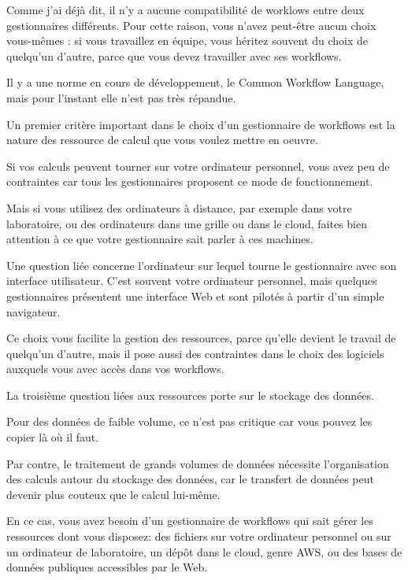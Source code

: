 \documentclass[12pt]{article}
\begin{document}
Comme j'ai déjà dit, il n'y a aucune compatibilité de worklows entre
deux gestionnaires différents. Pour cette raison, vous n'avez
peut-être aucun choix vous-mêmes : si vous travaillez en équipe, vous
héritez souvent du choix de quelqu'un d'autre, parce que vous devez
travailler avec ses workflows.

Il y a une norme en cours de développement, le Common Workflow
Language, mais pour l'instant elle n'est pas très répandue.

\newpage

Un premier critère important dans le choix d'un gestionnaire
de workflows est la nature des ressource de calcul que vous
voulez mettre en oeuvre.

Si vos calculs peuvent tourner sur votre ordinateur personnel,
vous avez peu de contraintes car tous les gestionnaires proposent
ce mode de fonctionnement.

Mais si vous utilisez des ordinateurs à distance, par exemple dans
votre laboratoire, ou des ordinateurs dans une grille
ou dans le cloud, faites bien attention à ce que votre gestionnaire
sait parler à ces machines.

\newpage

Une question liée concerne l'ordinateur sur lequel tourne le
gestionnaire avec son interface utilisateur. C'est souvent votre
ordinateur personnel, mais quelques gestionnaires présentent une
interface Web et sont pilotés à partir d'un simple navigateur.

Ce choix vous facilite la gestion des ressources, parce qu'elle
devient le travail de quelqu'un d'autre, mais il pose aussi des
contraintes dans le choix des logiciels auxquels vous avec accès dans
vos workflows.

\newpage

La troisième question liées aux ressources porte sur le stockage des
données.

Pour des données de faible volume, ce n'est pas critique car vous
pouvez les copier là où il faut.

Par contre, le traitement de grands volumes de données nécessite
l'organisation des calculs autour du stockage des données, car le
transfert de données peut devenir plus couteux que le calcul lui-même.

En ce cas, vous avez besoin d'un gestionnaire de workflows qui sait
gérer les ressources dont vous disposez: des fichiers sur votre
ordinateur personnel ou sur un ordinateur de laboratoire, un dépôt
dans le cloud, genre AWS, ou des bases de données publiques
accessibles par le Web.
\end{document}
